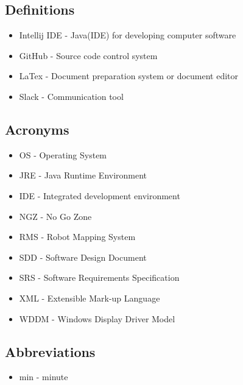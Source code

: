 \subsection{Definitions}
\begin{itemize}
\item Intellij IDE - Java(IDE) for developing computer software
\item GitHub - Source code control system
\item LaTex - Document preparation system or document editor 
\item Slack - Communication tool
\end{itemize}

\subsection{Acronyms}
\begin{itemize}
\item OS - Operating System
\item JRE - Java Runtime Environment
\item IDE - Integrated development environment
\item NGZ - No Go Zone
\item RMS - Robot Mapping System
\item SDD - Software Design Document
\item SRS - Software Requirements Specification
\item XML - Extensible Mark-up Language
\item WDDM - Windows Display Driver Model
\end{itemize}

\subsection{Abbreviations}
\begin{itemize}
	\item min - minute
\end{itemize}
